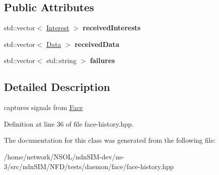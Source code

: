\subsection*{Public Attributes}
\begin{DoxyCompactItemize}
\item 
std\+::vector$<$ \hyperlink{classndn_1_1Interest}{Interest} $>$ {\bfseries received\+Interests}\hypertarget{classnfd_1_1tests_1_1FaceHistory_ab67f4a67c32ddc189a0f9e7c485c51df}{}\label{classnfd_1_1tests_1_1FaceHistory_ab67f4a67c32ddc189a0f9e7c485c51df}

\item 
std\+::vector$<$ \hyperlink{classndn_1_1Data}{Data} $>$ {\bfseries received\+Data}\hypertarget{classnfd_1_1tests_1_1FaceHistory_a930770a84a62a443cfc2ebc62b5c3403}{}\label{classnfd_1_1tests_1_1FaceHistory_a930770a84a62a443cfc2ebc62b5c3403}

\item 
std\+::vector$<$ std\+::string $>$ {\bfseries failures}\hypertarget{classnfd_1_1tests_1_1FaceHistory_a121dccac0ea05c2b4e44d472711b6765}{}\label{classnfd_1_1tests_1_1FaceHistory_a121dccac0ea05c2b4e44d472711b6765}

\end{DoxyCompactItemize}


\subsection{Detailed Description}
captures signals from \hyperlink{classnfd_1_1Face}{Face} 

Definition at line 36 of file face-\/history.\+hpp.



The documentation for this class was generated from the following file\+:\begin{DoxyCompactItemize}
\item 
/home/network/\+N\+S\+O\+L/ndn\+S\+I\+M-\/dev/ns-\/3/src/ndn\+S\+I\+M/\+N\+F\+D/tests/daemon/face/face-\/history.\+hpp\end{DoxyCompactItemize}
